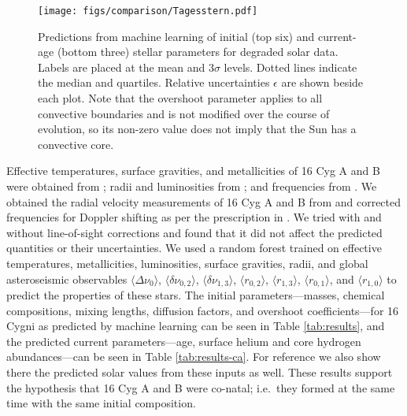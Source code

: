\documentclass[twocolumn,twocolappendix]{aastex6}
\begin{document}
\begin{figure*}
    \centering
    \texttt{[image: figs/comparison/Tagesstern.pdf]}
    \caption{Predictions from machine learning of initial (top six) and current-age (bottom three) stellar parameters for degraded solar data. Labels are placed at the mean and 3$\sigma$ levels. Dotted lines indicate the median and quartiles. Relative uncertainties $\epsilon$ are shown beside each plot. Note that the overshoot parameter applies to all convective boundaries and is not modified over the course of evolution, so its non-zero value does not imply that the Sun has a convective core. } 
    \label{fig:corner}
\end{figure*}

Effective temperatures, surface gravities, and metallicities of 16 Cyg A and B were obtained from \citet{2009A&A...508L..17R}; radii and luminosities from \citet{2013MNRAS.433.1262W}; and frequencies from \citet{2015MNRAS.446.2959D}. We obtained the radial velocity measurements of 16 Cyg A and B from \citet{2002ApJS..141..503N} and corrected frequencies for Doppler shifting as per the prescription in \citet{2014MNRAS.445L..94D}. We tried with and without line-of-sight corrections and found that it did not affect the predicted quantities or their uncertainties. We used a random forest trained on effective temperatures, metallicities, luminosities, surface gravities, radii, and global asteroseismic observables $\langle \Delta\nu_0 \rangle$, $\langle \delta\nu_{0,2} \rangle$, $\langle \delta\nu_{1,3} \rangle$, $\langle r_{0,2} \rangle$, $\langle r_{1,3} \rangle$, $\langle r_{0,1} \rangle$, and $\langle r_{1,0} \rangle$ to predict the properties of these stars. The initial parameters---masses, chemical compositions, mixing lengths, diffusion factors, and overshoot coefficients---for 16 Cygni as predicted by machine learning can be seen in Table \ref{tab:results}, and the predicted current parameters---age, surface helium and core hydrogen abundances---can be seen in Table \ref{tab:results-ca}. For reference we also show there the predicted solar values from these inputs as well. These results support the hypothesis that 16 Cyg A and B were co-natal; i.e.\ they formed at the same time with the same initial composition. 
\end{document}

